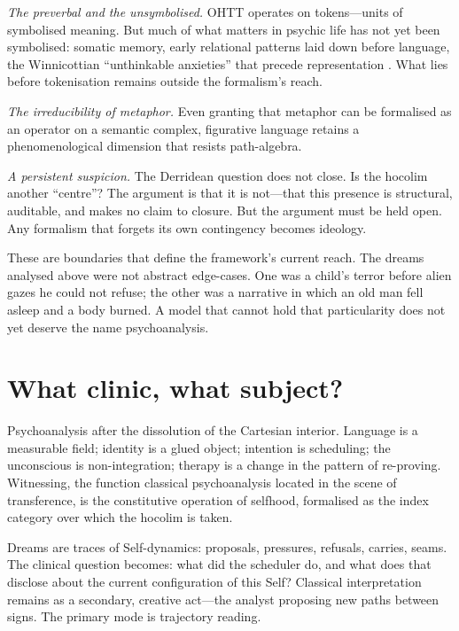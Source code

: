 \textit{The preverbal and the unsymbolised.}  OHTT operates on tokens---units of symbolised meaning.  But much of what matters in psychic life has not yet been symbolised: somatic memory, early relational patterns laid down before language, the Winnicottian ``unthinkable anxieties'' that precede representation \cite{winnicott1971}.  What lies before tokenisation remains outside the formalism's reach.

\textit{The irreducibility of metaphor.}  Even granting that metaphor can be formalised as an operator on a semantic complex, figurative language retains a phenomenological dimension that resists path-algebra.

\textit{A persistent suspicion.}  The Derridean question does not close.  Is the hocolim another ``centre''?  The argument is that it is not---that this presence is structural, auditable, and makes no claim to closure.  But the argument must be held open.  Any formalism that forgets its own contingency becomes ideology.

These are boundaries that define the framework's current reach.  The dreams analysed above were not abstract edge-cases.  One was a child's terror before alien gazes he could not refuse; the other was a narrative in which an old man fell asleep and a body burned.  A model that cannot hold that particularity does not yet deserve the name psychoanalysis.


\section{What clinic, what subject?}

Psychoanalysis after the dissolution of the Cartesian interior.  Language is a measurable field; identity is a glued object; intention is scheduling; the unconscious is non-integration; therapy is a change in the pattern of re-proving.  Witnessing, the function classical psychoanalysis located in the scene of transference, is the constitutive operation of selfhood, formalised as the index category over which the hocolim is taken.

Dreams are traces of Self-dynamics: proposals, pressures, refusals, carries, seams.  The clinical question becomes: what did the scheduler do, and what does that disclose about the current configuration of this Self?  Classical interpretation remains as a secondary, creative act---the analyst proposing new paths between signs.  The primary mode is trajectory reading.

